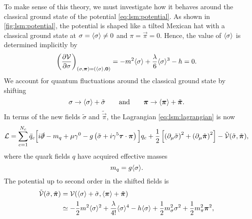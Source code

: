 To make sense of this theory, we must investigate how it behaves around the classical ground state of the potential \eqref{eq:lsm:potential}.
As shown in \cref{fig:lsm:potential}, the potential is shaped like a tilted Mexican hat with a classical ground state at $\sigma = \langle \sigma \rangle \neq 0$ and $\pi = \vec\pi = 0$.
Hence, the value of $\langle \sigma \rangle$ is determined implicitly by
\begin{equation}
	\pdv{\mathcal{V}}{\sigma}_{(\sigma,{\bm{\pi}})=(\langle \sigma \rangle,{\bm{0}})} = -m^2 \langle \sigma \rangle + \frac{\lambda}{6} \langle \sigma \rangle^3 - h = 0 .
\label{eq:lsm:ground_state_implicit}
\end{equation}
We account for quantum fluctuations around the classical ground state by shifting
\begin{equation}
	\sigma \rightarrow \left\langle \sigma \right\rangle + \tilde{\sigma}
	\qquad \text{and} \qquad
	{\bm{\pi}} \rightarrow \left\langle {\bm{\pi}} \right\rangle + \tilde{{\bm{\pi}}}.
\end{equation}
In terms of the new fields $\tilde\sigma$ and $\tilde{\vec\pi}$, the Lagrangian \eqref{eq:lsm:lagrangian} is now
\begin{equation}
	\lagr = \sum_{c=1}^{N_c} \bar{q}_c \Big[ i \slashed\partial - m_q + \mu \gamma^0 - g \left( \tilde{\sigma} + i \gamma^5 \vec\tau \cdot \vec\pi \right) \Big] q_c
	      + \frac12 \left[ \left( \partial_\mu \tilde{\sigma} \right)^2 + \left( \partial_\mu \tilde{\vec\pi} \right)^2 \right] - \tilde{\pot}(\tilde{\sigma},\tilde{\vec\pi}) , %
\end{equation}
where the quark fields $q$ have acquired effective masses
\begin{equation}
	m_q = g \langle \sigma \rangle .
\label{eq:lsm:mass_quark}
\end{equation}
The potential up to second order in the shifted fields is
\begin{equation}
\begin{split}
	\tilde{\mathcal{V}}(\tilde{\sigma},\tilde{{\bm{\pi}}}) &= \mathcal{V}(\langle \sigma \rangle+\tilde{\sigma},\langle {\bm{\pi}} \rangle+\tilde{{\bm{\pi}}}) \\
	                                             &\simeq -\frac12 m^2 \langle \sigma \rangle^2 + \frac{\lambda}{4!} \langle \sigma \rangle^4 - h \langle \sigma \rangle + \frac12 m_\sigma^2 \sigma^2  + \frac12 m_\pi^2 {\bm{\pi}}^2 ,
\label{eq:lsm:potential_shifted}
\end{split}
\end{equation}
